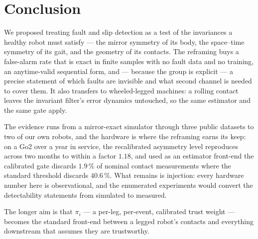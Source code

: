 \section{Conclusion}
\label{sec:conclusion}

We proposed treating fault and slip detection as a test of the invariances a healthy robot must satisfy --- the mirror
symmetry of its body, the space--time symmetry of its gait, and the geometry of its contacts. The reframing buys a
false-alarm rate that is exact in finite samples with no fault data and no training, an anytime-valid sequential form,
and --- because the group is explicit --- a precise statement of which faults are invisible and what second channel is
needed to cover them. It also transfers to wheeled-legged machines: a rolling contact leaves the invariant filter's
error dynamics untouched, so the same estimator and the same gate apply.

The evidence runs from a mirror-exact simulator through three public datasets to two of our own robots, and the
hardware is where the reframing earns its keep: on a Go2 over a year in service, the recalibrated asymmetry level
reproduces across two months to within a factor $1.18$, and used as an estimator front-end the calibrated gate discards
$1.9\,\%$ of nominal contact measurements where the standard threshold discards $40.6\,\%$. What remains is
injection: every hardware number here is observational, and the enumerated experiments would convert the detectability
statements from simulated to measured.

The longer aim is that $\pi_i$ --- a per-leg, per-event, calibrated trust weight --- becomes the standard front-end
between a legged robot's contacts and everything downstream that assumes they are trustworthy.
